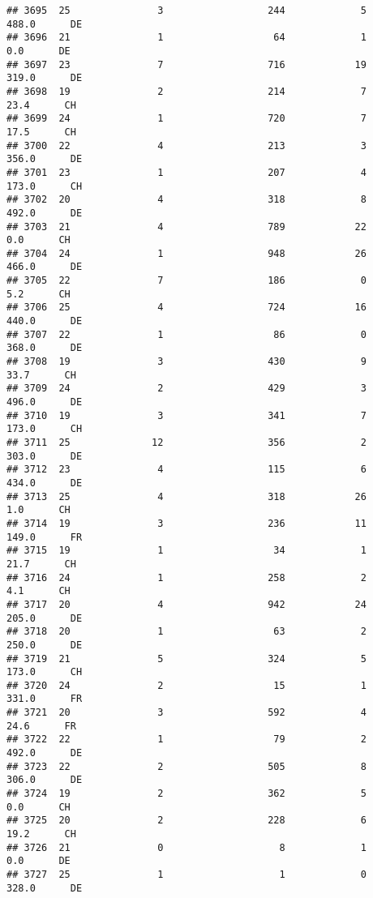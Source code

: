 \documentclass[
]{article}
\begin{document}
\begin{verbatim}
## 3695  25               3                  244             5    488.0      DE
## 3696  21               1                   64             1      0.0      DE
## 3697  23               7                  716            19    319.0      DE
## 3698  19               2                  214             7     23.4      CH
## 3699  24               1                  720             7     17.5      CH
## 3700  22               4                  213             3    356.0      DE
## 3701  23               1                  207             4    173.0      CH
## 3702  20               4                  318             8    492.0      DE
## 3703  21               4                  789            22      0.0      CH
## 3704  24               1                  948            26    466.0      DE
## 3705  22               7                  186             0      5.2      CH
## 3706  25               4                  724            16    440.0      DE
## 3707  22               1                   86             0    368.0      DE
## 3708  19               3                  430             9     33.7      CH
## 3709  24               2                  429             3    496.0      DE
## 3710  19               3                  341             7    173.0      CH
## 3711  25              12                  356             2    303.0      DE
## 3712  23               4                  115             6    434.0      DE
## 3713  25               4                  318            26      1.0      CH
## 3714  19               3                  236            11    149.0      FR
## 3715  19               1                   34             1     21.7      CH
## 3716  24               1                  258             2      4.1      CH
## 3717  20               4                  942            24    205.0      DE
## 3718  20               1                   63             2    250.0      DE
## 3719  21               5                  324             5    173.0      CH
## 3720  24               2                   15             1    331.0      FR
## 3721  20               3                  592             4     24.6      FR
## 3722  22               1                   79             2    492.0      DE
## 3723  22               2                  505             8    306.0      DE
## 3724  19               2                  362             5      0.0      CH
## 3725  20               2                  228             6     19.2      CH
## 3726  21               0                    8             1      0.0      DE
## 3727  25               1                    1             0    328.0      DE

\end{verbatim}
\end{document}
